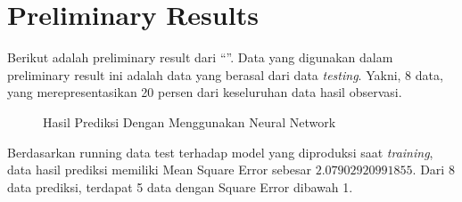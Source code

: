 \chapter{Preliminary Results}
Berikut adalah preliminary result dari ``{\Title}''. Data yang digunakan dalam preliminary result ini adalah data yang berasal dari data \emph{testing}. Yakni, 8 data, yang merepresentasikan 20 persen dari keseluruhan data hasil  observasi.

\begin{figure}[ht]
  \begin{center}
    \caption{Hasil Prediksi Dengan Menggunakan Neural Network}
  \end{center}
\end{figure}

Berdasarkan running data test terhadap model yang diproduksi saat \emph{training}, data hasil prediksi memiliki Mean Square Error sebesar $2.07902920991855$. Dari 8 data prediksi, terdapat 5 data dengan Square Error dibawah 1.
